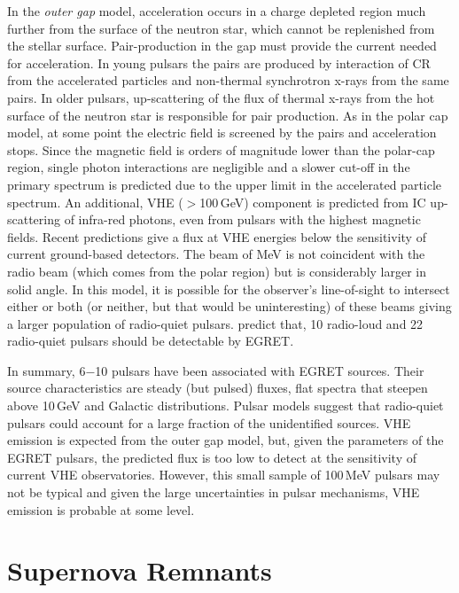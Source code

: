 In the \textit{outer gap} model, acceleration occurs in a charge
depleted region much further from the surface of the neutron star,
which cannot be replenished from the stellar surface. Pair-production
in the gap must provide the current needed for acceleration. In young
pulsars the pairs are produced by interaction of CR from the
accelerated particles and non-thermal synchrotron x-rays from the same
pairs. In older pulsars, up-scattering of the flux of thermal x-rays
from the hot surface of the neutron star is responsible for pair
production. As in the polar cap model, at some point the electric
field is screened by the pairs and acceleration stops. Since the
magnetic field is orders of magnitude lower than the polar-cap region,
single photon interactions are negligible and a slower cut-off in the
primary \Gray spectrum is predicted due to the upper limit in the
accelerated particle spectrum. An additional, VHE ($>$100\,GeV)
component is predicted from IC up-scattering of infra-red photons,
even from pulsars with the highest magnetic fields. Recent
predictions give a flux at VHE energies below the sensitivity of
current ground-based detectors. The beam of MeV
\Grays is not coincident with the radio beam (which comes from the
polar region) but is considerably larger in solid angle. In this
model, it is possible for the observer's line-of-sight to intersect
either or both (or neither, but that would be uninteresting) of these
beams giving a larger population of radio-quiet \Gray pulsars.
\citet{REF::ZHANGZHANGCHENG::AA2000} predict that, 10 radio-loud and
22 radio-quiet pulsars should be detectable by EGRET.

In summary, 6$-$10 pulsars have been associated with EGRET
sources. Their source characteristics are steady (but pulsed) fluxes,
flat spectra that steepen above 10\,GeV and Galactic distributions.
Pulsar models suggest that radio-quiet pulsars could account for a
large fraction of the unidentified sources. VHE emission is expected
from the outer gap model, but, given the parameters of the EGRET
pulsars, the predicted flux is too low to detect at the
sensitivity of current VHE observatories. However, this small sample
of 100\,MeV pulsars may not be typical and given the large
uncertainties in pulsar mechanisms, VHE emission is probable at some
level.

\section{Supernova Remnants} 
\label{SEC::SOURCES::SNR}

